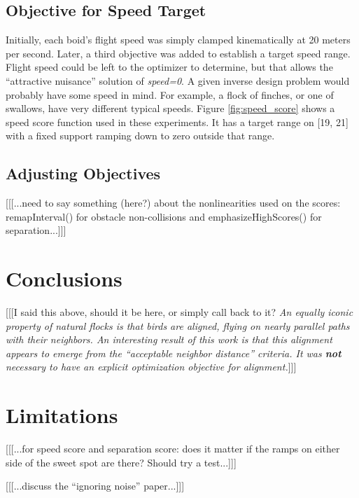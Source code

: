 \documentclass[letterpaper]{article}
\begin{document}
\subsection{Objective for Speed Target}
\label{subsec:speed_objective}

Initially, each boid's flight speed was simply clamped kinematically at 20 meters per second. Later, a third objective was added to establish a target speed range. Flight speed could be left to the optimizer to determine, but that allows the ``attractive nuisance'' solution of \textit{speed=0}. A given inverse design problem would probably have some speed in mind. For example, a flock of finches, or one of swallows, have very different typical speeds. Figure \ref{fig:speed_score} shows a speed score function used in these experiments. It has a target range on [19, 21] with a fixed support ramping down to zero outside that range.

\subsection{Adjusting Objectives}
\label{subsec:adjust_objective}

[[[...need to say something (here?) about the nonlinearities used on the scores: remapInterval() for obstacle non-collisions and emphasizeHighScores() for separation...]]]

\section{Conclusions}
\label{sec:Conclusions}

[[[I said this above, should it be here, or simply call back to it? \textit{An equally iconic property of natural flocks is that birds are aligned, flying on nearly parallel paths with their neighbors. An interesting result of this work is that this alignment appears to \textit{emerge} from the ``acceptable neighbor distance'' criteria. It was \textbf{not} necessary to have an explicit optimization objective for alignment.}]]]

\section{Limitations}
\label{sec:limitations}

[[[...for speed score and separation score: does it matter if the ramps on either side of the sweet spot are there? Should try a test...]]]

[[[...discuss the ``ignoring noise'' paper...]]]
\end{document}
